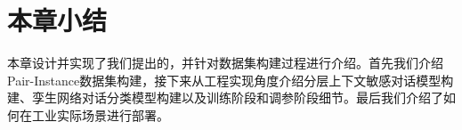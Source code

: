 \section{本章小结}

本章设计并实现了我们提出的{\tool}，并针对数据集构建过程进行介绍。首先我们介绍Pair-Instance数据集构建，接下来从工程实现角度介绍分层上下文敏感对话模型构建、孪生网络对话分类模型构建以及训练阶段和调参阶段细节。最后我们介绍了{\tool}如何在工业实际场景进行部署。